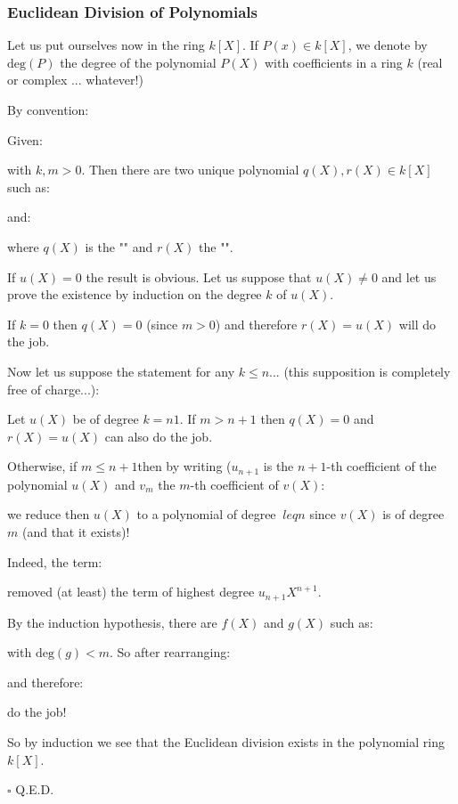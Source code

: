 	\subsubsection{Euclidean Division of Polynomials}\label{polynomials division}
	Let us put ourselves now in the ring $k[X]$. If $P(x)\in k[X]$, we denote by $\text{deg}(P)$ the degree of the polynomial $P(X)$ with coefficients in a ring $k$ (real or complex ... whatever!)
	\begin{tcolorbox}[title=Remark,colframe=black,arc=10pt]
	By convention:
	
	\end{tcolorbox}
	\begin{theorem}
	Given:
	
	with $k,m>0$. Then there are two unique polynomial $q(X),r(X)\in k[X]$ such as:
	
	and:
	
	where $q(X)$ is the "" and $r(X)$ the "".
	\end{theorem}
	\begin{dem}
	If $u (X) = 0$ the result is obvious. Let us suppose that $u(X)\neq 0$ and let us prove the existence by induction on the degree $k$ of $u (X)$.
	
	If $k = 0$ then $q (X) = 0$ (since $m>0$) and therefore $r (X) = u (X)$ will do the job.
	
	Now let us suppose the statement for any $k\leq n$... (this supposition is completely free of charge...):
	
	Let $u (X)$ be of degree $k=n1$. If $m>n+1$ then $q (X) = 0$ and $r (X) = u (X)$ can also do the job.
	
	Otherwise, if $m\leq n+1$then by writing ($u_{n+1}$ is the $n+1$-th coefficient of the polynomial $u(X)$ and $v_m$ the $m$-th coefficient of $v(X)$:
	
	we reduce then $ u (X) $ to a polynomial of degree $ \ leq n $ since $v (X)$ is of degree $m$ (and that it exists)!
	
	Indeed, the term:
	
	removed (at least) the term of highest degree $u_{n+1}X^{n+1}$.
	
	By the induction hypothesis, there are $f(X)$ and $g(X)$ such as:
	
	with $\text{deg}(g)<m$. So after rearranging:
	
	and therefore:
	
	do the job!
	
	So by induction we see that the Euclidean division exists in the polynomial ring $k[X]$.
	\begin{flushright}
		$\square$  Q.E.D.
	\end{flushright}
	\end{dem}
